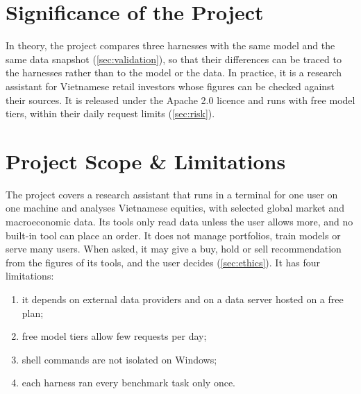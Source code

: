 \section{Significance of the Project}\label{sec:significance}
In theory, the project compares three harnesses with the same model and the same data snapshot (\cref{sec:validation}), so that their differences can be traced to the harnesses rather than to the model or the data.
In practice, it is a research assistant for Vietnamese retail investors whose figures can be checked against their sources.
It is released under the Apache 2.0 licence and runs with free model tiers, within their daily request limits (\cref{sec:risk}).

\section{Project Scope \& Limitations}\label{sec:scope}
The project covers a research assistant that runs in a terminal for one user on one machine and analyses Vietnamese equities, with selected global market and macroeconomic data.
Its tools only read data unless the user allows more, and no built-in tool can place an order.
It does not manage portfolios, train models or serve many users.
When asked, it may give a buy, hold or sell recommendation from the figures of its tools, and the user decides (\cref{sec:ethics}).
It has four limitations:
\begin{enumerate}
  \item it depends on external data providers and on a data server hosted on a free plan;
  \item free model tiers allow few requests per day;
  \item shell commands are not isolated on Windows;
  \item each harness ran every benchmark task only once.
\end{enumerate}
